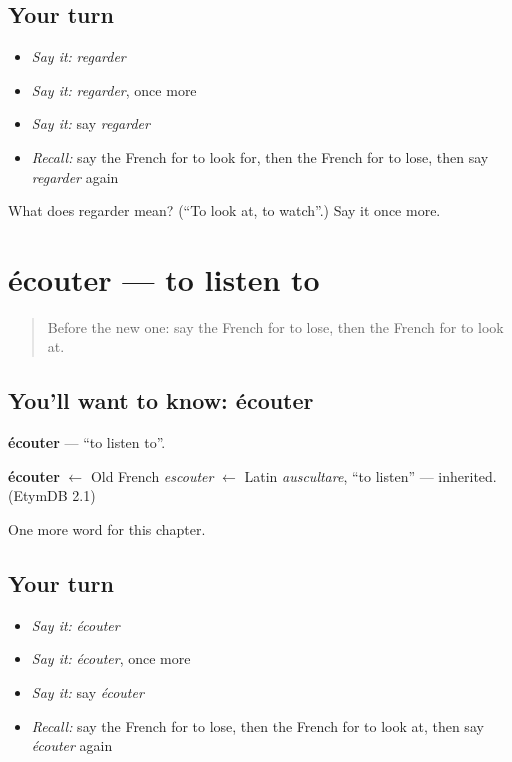 \subsection*{Your turn}
\begin{itemize}
\raggedright
  \item \emph{Say it:} \emph{regarder}
  \item \emph{Say it:} \emph{regarder}, once more
  \item \emph{Say it:} say \emph{regarder}
  \item \emph{Recall:} say the French for to look for, then the French for to lose, then say \emph{regarder} again
\end{itemize}

\begin{tcolorbox}[breakable,colback=teal!4,colframe=teal!35!black,title={Before you move on}]
What does regarder mean? (\textquotedblleft{}To look at, to watch\textquotedblright{}.) Say it once more.
\end{tcolorbox}
\section[écouter]{écouter — to listen to}

\label{lesson:FR-C64-ecouter}



\begin{quote}
Before the new one: say the French for to lose, then the French for to look at.
\end{quote}

\subsection*{You'll want to know: écouter}
\textbf{écouter} — \textquotedblleft{}to listen to\textquotedblright{}.

\begin{cousinweb}
\textbf{écouter} $\leftarrow$ Old French \emph{escouter} $\leftarrow$ Latin \emph{auscultare}, \textquotedblleft{}to listen\textquotedblright{} — inherited. (EtymDB 2.1)
\end{cousinweb}

\begin{grammarlens}[title={What you've built}]
One more word for this chapter.
\end{grammarlens}

\subsection*{Your turn}
\begin{itemize}
\raggedright
  \item \emph{Say it:} \emph{écouter}
  \item \emph{Say it:} \emph{écouter}, once more
  \item \emph{Say it:} say \emph{écouter}
  \item \emph{Recall:} say the French for to lose, then the French for to look at, then say \emph{écouter} again
\end{itemize}

